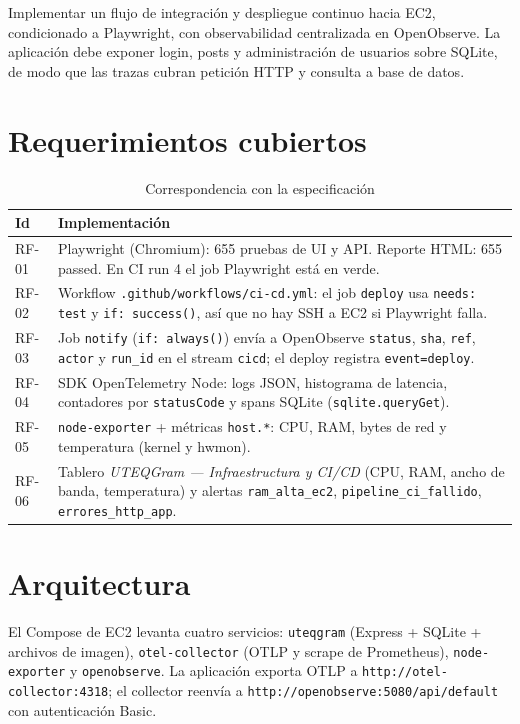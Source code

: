 \documentclass[12pt,letterpaper]{article}
\begin{document}
Implementar un flujo de integraci\'on y despliegue continuo hacia EC2, condicionado a Playwright, con observabilidad centralizada en OpenObserve. La aplicaci\'on debe exponer login, posts y administraci\'on de usuarios sobre SQLite, de modo que las trazas cubran petici\'on HTTP y consulta a base de datos.

\section{Requerimientos cubiertos}

\begin{table}[h]
\centering
\caption{Correspondencia con la especificaci\'on}
\begin{tabular}{|p{2.4cm}|p{11cm}|}
\hline
\textbf{Id} & \textbf{Implementaci\'on} \\
\hline
RF-01 & Playwright (Chromium): 655 pruebas de UI y API. Reporte HTML: 655 passed. En CI run 4 el job Playwright est\'a en verde. \\
\hline
RF-02 & Workflow \texttt{.github/workflows/ci-cd.yml}: el job \texttt{deploy} usa \texttt{needs: test} y \texttt{if: success()}, as\'i que no hay SSH a EC2 si Playwright falla. \\
\hline
RF-03 & Job \texttt{notify} (\texttt{if: always()}) env\'ia a OpenObserve \texttt{status}, \texttt{sha}, \texttt{ref}, \texttt{actor} y \texttt{run\_id} en el stream \texttt{cicd}; el deploy registra \texttt{event=deploy}. \\
\hline
RF-04 & SDK OpenTelemetry Node: logs JSON, histograma de latencia, contadores por \texttt{statusCode} y spans SQLite (\texttt{sqlite.queryGet}). \\
\hline
RF-05 & \texttt{node-exporter} + m\'etricas \texttt{host.*}: CPU, RAM, bytes de red y temperatura (kernel y hwmon). \\
\hline
RF-06 & Tablero \textit{UTEQGram --- Infraestructura y CI/CD} (CPU, RAM, ancho de banda, temperatura) y alertas \texttt{ram\_alta\_ec2}, \texttt{pipeline\_ci\_fallido}, \texttt{errores\_http\_app}. \\
\hline
\end{tabular}
\end{table}

\section{Arquitectura}

El Compose de EC2 levanta cuatro servicios: \texttt{uteqgram} (Express + SQLite + archivos de imagen), \texttt{otel-collector} (OTLP y scrape de Prometheus), \texttt{node-exporter} y \texttt{openobserve}. La aplicaci\'on exporta OTLP a \texttt{http://otel-collector:4318}; el collector reenv\'ia a \texttt{http://openobserve:5080/api/default} con autenticaci\'on Basic.
\end{document}
